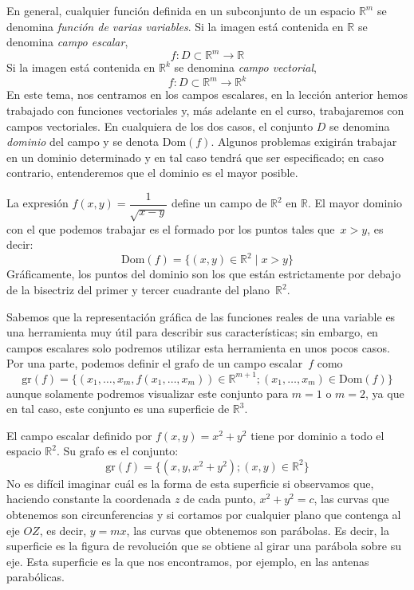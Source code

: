 En general, cualquier función definida en un subconjunto de un espacio $\mathbb{R}^m$ se denomina
\emph{función de varias variables}.
Si la imagen está contenida en $\mathbb{R}$ se denomina \emph{campo escalar},
\[
f\colon \mathit{D}\subset \mathbb{R}^m\to\mathbb{R}
\]
Si la imagen está contenida en $\mathbb{R}^k$ se denomina \emph{campo vectorial},
\[
f\colon \mathit{D}\subset \mathbb{R}^m\to\mathbb{R}^k
\]
En este tema, nos centramos en los campos escalares, en la lección anterior hemos trabajado con funciones vectoriales y, más adelante en el curso, trabajaremos con campos vectoriales.
En cualquiera de los dos casos, el conjunto $\mathit{D}$ se denomina \emph{dominio} del campo y se denota $\mathrm{Dom}(f)$.
Algunos problemas exigirán trabajar en un dominio determinado y en tal caso tendrá que ser especificado;
en caso contrario, entenderemos que el dominio es el mayor posible.
%
\begin{ejemplo}
La expresión $f(x,y)=\dfrac1{\sqrt{x-y}}$ define un campo de $\mathbb{R}^2$ en $\mathbb{R}$.
El mayor dominio con el que podemos trabajar es el formado por los puntos tales que~$x>y$, es decir:
\[
\mathrm{Dom}(f)=\{(x,y)\in\mathbb{R}^2\mid x>y\}
\]
Gráficamente, los puntos del dominio son los que están estrictamente por debajo de la bisectriz del primer y tercer cuadrante del plano~$\mathbb{R}^2$.\fej
\end{ejemplo}
%
Sabemos que la representación gráfica de las funciones reales de una variable es una herramienta muy útil para describir sus características; sin embargo, en campos escalares solo podremos utilizar esta herramienta en unos pocos casos.
Por una parte, podemos definir el grafo de un campo escalar~$f$ como
%
\[
\mathrm{gr}(f)=\{ (x_1,\dots,x_m,f(x_1,\dots,x_m))\in\mathbb{R}^{m+1};
(x_1,\dots,x_m)\in\mathrm{Dom}(f)\}
\]
aunque solamente podremos visualizar este conjunto para $m=1$ o $m=2$, ya que en tal caso, este conjunto es una superficie de $\mathbb{R}^3$.
%
\begin{ejemplo}
El campo escalar definido por $f(x,y)=x^2+y^2$ tiene por dominio a todo el espacio $\mathbb{R}^2$.
Su grafo es el conjunto:
\[
\mathrm{gr}(f)=\{ (x,y,x^2+y^2); (x,y)\in\mathbb{R}^2\}
\]
No es difícil imaginar cuál es la forma de esta superficie si observamos que, haciendo constante la coordenada $z$ de cada punto, $x^2+y^2=c$, las curvas que obtenemos son circunferencias y si cortamos por cualquier plano que contenga al eje $OZ$, es decir,
$y=mx$, las curvas que obtenemos son parábolas.
Es decir, la superficie es la figura de revolución que se obtiene al girar una parábola sobre su eje.
Esta superficie es la que nos encontramos, por ejemplo, en las antenas parabólicas.\fej
\end{ejemplo}

